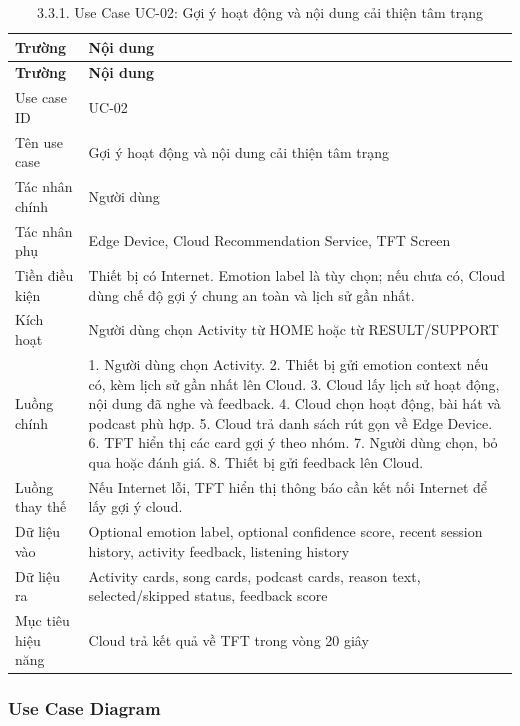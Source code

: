 \documentclass[12pt,a4paper]{article}
\begin{document}
\begin{center}
\begin{longtable}{|P{0.30\textwidth}|P{0.62\textwidth}|}
\caption{3.3.1. Use Case UC-02: Gợi ý hoạt động và nội dung cải thiện tâm trạng}\\
\hline
\textbf{Trường} & \textbf{Nội dung} \\
\hline
\endfirsthead
\hline
\textbf{Trường} & \textbf{Nội dung} \\
\hline
\endhead
Use case ID & UC-02 \\
\hline
Tên use case & Gợi ý hoạt động và nội dung cải thiện tâm trạng \\
\hline
Tác nhân chính & Người dùng \\
\hline
Tác nhân phụ & Edge Device, Cloud Recommendation Service, TFT Screen \\
\hline
Tiền điều kiện & Thiết bị có Internet. Emotion label là tùy chọn; nếu chưa có, Cloud dùng chế độ gợi ý chung an toàn và lịch sử gần nhất. \\
\hline
Kích hoạt & Người dùng chọn Activity từ HOME hoặc từ RESULT/SUPPORT \\
\hline
Luồng chính & 1. Người dùng chọn Activity. 2. Thiết bị gửi emotion context nếu có, kèm lịch sử gần nhất lên Cloud. 3. Cloud lấy lịch sử hoạt động, nội dung đã nghe và feedback. 4. Cloud chọn hoạt động, bài hát và podcast phù hợp. 5. Cloud trả danh sách rút gọn về Edge Device. 6. TFT hiển thị các card gợi ý theo nhóm. 7. Người dùng chọn, bỏ qua hoặc đánh giá. 8. Thiết bị gửi feedback lên Cloud. \\
\hline
Luồng thay thế & Nếu Internet lỗi, TFT hiển thị thông báo cần kết nối Internet để lấy gợi ý cloud. \\
\hline
Dữ liệu vào & Optional emotion label, optional confidence score, recent session history, activity feedback, listening history \\
\hline
Dữ liệu ra & Activity cards, song cards, podcast cards, reason text, selected/skipped status, feedback score \\
\hline
Mục tiêu hiệu năng & Cloud trả kết quả về TFT trong vòng 20 giây \\
\hline
\end{longtable}
\end{center}

\subsubsection*{Use Case Diagram}
\end{document}
